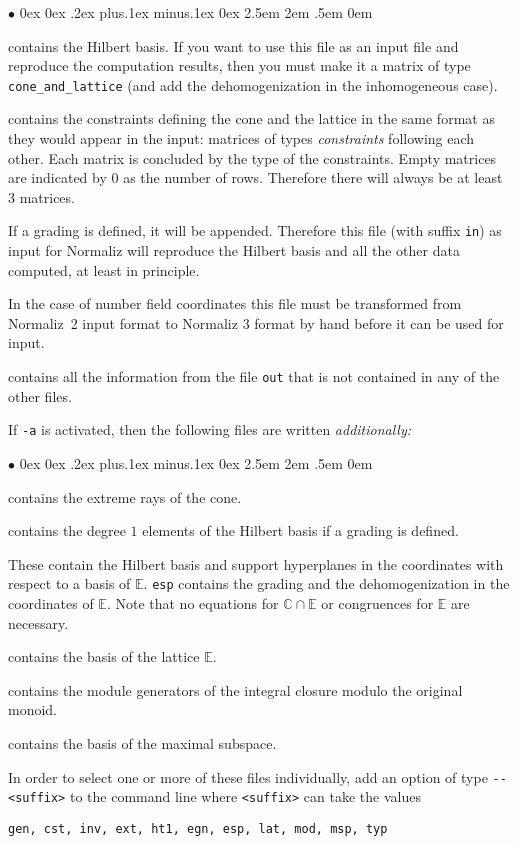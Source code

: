 \documentclass[12pt,a4paper]{scrartcl}
\newcommand{\stdli}{ \topsep0ex \partopsep0ex %
\parsep.2ex plus.1ex minus.1ex \itemsep0ex%
\leftmargin2.5em \labelwidth2em \labelsep.5em \rightmargin0em}%
\renewenvironment{itemize}{\begin{list}{{$\bullet$}}{\stdli}}{\end{list}}
\theoremstyle{definition}
\def\CC{{\mathbb C}}
\def\EE{{\mathbb E}}
\def\itemtt[#1]{\item[\textbf{\ttt{#1}}]}
\def\ttt{\texttt}
\begin{document}
\begin{itemize}
\itemtt[gen] contains the Hilbert basis. If you want to use this file as an input file and reproduce the computation results, then you must make it a matrix of type \verb|cone_and_lattice| (and add the dehomogenization in the inhomogeneous case).

\itemtt[cst] contains the constraints defining the cone
and the lattice in the same format as they would appear
in the input: matrices of types \emph{constraints} following each
other. Each matrix is concluded by the type of the constraints.
Empty matrices are indicated by $0$ as the
number of rows. Therefore there will always be at least
$3$ matrices.

If a grading is defined, it will be appended. Therefore
this file (with suffix \ttt{in}) as input for
Normaliz will reproduce the Hilbert basis and all the
other data computed, at least in principle.

In the case of number field coordinates this file must be transformed from Normaliz~2 input format to Normaliz 3 format by hand before it can be used for input.

\itemtt[inv]  contains all the information from the
file \ttt{out} that is not contained in any of the
other files.
\end{itemize}

If \ttt{-a} is activated, then the following files are written
\emph{additionally:}

\begin{itemize}

\itemtt[ext] contains the extreme rays of the cone.

\itemtt[ht1] contains the degree $1$ elements of the
Hilbert basis if a grading is defined.

\itemtt[egn,esp] These contain the Hilbert basis and
support hyperplanes in the coordinates with respect to
a basis of $\EE$. \ttt{esp} contains the grading and the dehomogenization in the
coordinates of $\EE$. Note that no
equations for $\CC\cap\EE$ or congruences for $\EE$ are
necessary.

\itemtt[lat] contains the basis of the lattice $\EE$.

\itemtt[mod] contains the module generators of the integral closure modulo the original monoid.

\itemtt[msp] contains the basis of the maximal subspace.
\end{itemize}

In order to select one or more of these files individually, add an option of type \verb|--<suffix>| to the command line where \verb|<suffix>| can take the values
\begin{Verbatim}
gen, cst, inv, ext, ht1, egn, esp, lat, mod, msp, typ
\end{Verbatim}
\end{document}
